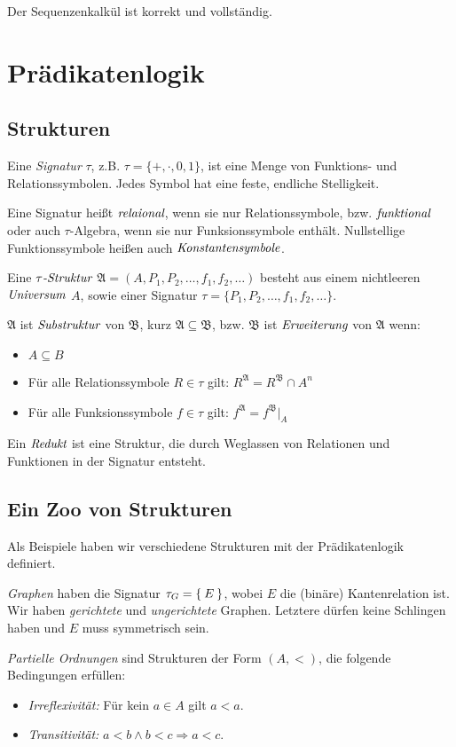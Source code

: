 \documentclass[a4paper,parskip=half*,DIV=15,fontsize=11pt]{scrartcl}
\newcommand{\A}{\mathfrak{A}}
\newcommand{\B}{\mathfrak{B}}
\begin{document}
Der Sequenzenkalkül ist korrekt und vollständig.

\section{Prädikatenlogik}
\subsection{Strukturen}
Eine \emph{Signatur} $\tau$, z.B. $\tau=\{+,\cdot,0,1\}$, ist eine Menge von Funktions- und Relationssymbolen. Jedes Symbol hat eine feste, endliche Stelligkeit.

Eine Signatur heißt $\emph{relaional}$, wenn sie nur Relationssymbole, bzw. $\emph{funktional}$ oder auch $\tau$-Algebra, wenn sie nur Funksionssymbole enthält. Nullstellige Funktionssymbole heißen auch $\emph{Konstantensymbole}$.

Eine $\tau\emph{-Struktur}$ $\A=(A,P_1,P_2,\ldots,f_1,f_2,\ldots)$ besteht aus einem nichtleeren $\emph{Universum}$ $A$, sowie einer Signatur $\tau=\{P_1,P_2,\ldots,f_1,f_2,\ldots\}$.

$\A$ ist $\emph{Substruktur}$ von $\B$, kurz $\A \subseteq \B$, bzw. $\B$ ist $\emph{Erweiterung}$ von $\A$ wenn:
\begin{itemize}
    \item $A \subseteq B$
    \item Für alle Relationssymbole $R \in \tau$ gilt: $R^{\A}=R^{\B} \cap A^n$
    \item Für alle Funksionssymbole $f \in \tau$ gilt: $f^{\A}=f^{\B}|_A$
\end{itemize}

Ein $\emph{Redukt}$ ist eine Struktur, die durch Weglassen von Relationen und Funktionen in der Signatur entsteht.

\subsection{Ein Zoo von Strukturen}

Als Beispiele haben wir verschiedene Strukturen mit der Prädikatenlogik definiert.

\emph{Graphen} haben die Signatur $\tau_G = \Set{E}$, wobei $E$ die (binäre) Kantenrelation ist. Wir haben \emph{gerichtete} und \emph{ungerichtete} Graphen. Letztere dürfen keine Schlingen haben und $E$ muss symmetrisch sein.

\emph{Partielle Ordnungen} sind Strukturen der Form $(A,<)$, die folgende Bedingungen erfüllen:
\begin{itemize}
  \item \emph{Irreflexivität:} Für kein $a \in A$ gilt $a < a$.
  \item \emph{Transitivität:} $a < b \land b < c \Rightarrow a < c$.
\end{itemize}
\end{document}
